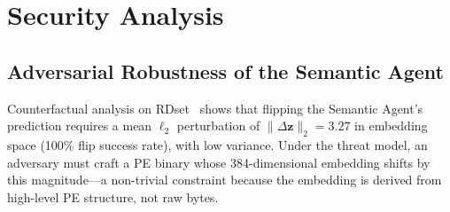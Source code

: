 \documentclass[journal]{IEEEtran}
\begin{document}
\begin{table}[t]
\centering
\caption{Comparison of Extended Agentic SABRE+ with representative
ransomware and intrusion-detection systems.
\checkmark = fully supported; $\circ$ = partial; $\times$ = absent.}
\label{tab:comparison}
\end{table}


\section{Security Analysis}
\label{sec:security}

\subsection{Adversarial Robustness of the Semantic Agent}
Counterfactual analysis on RDset~\cite{kabuye2026sabre}
shows that flipping the Semantic Agent's prediction requires a mean
$\ell_2$ perturbation of $\|\Delta\mathbf{z}\|_2 = 3.27$ in
embedding space (100\% flip success rate), with low variance.
Under the threat model, an adversary must craft a PE binary whose
384-dimensional embedding shifts by this magnitude---a non-trivial
constraint because the embedding is derived from high-level PE structure,
not raw bytes.
\end{document}
